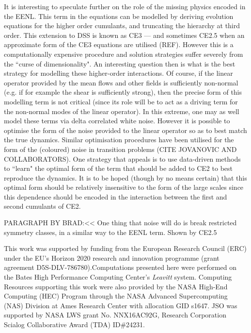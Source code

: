 \documentclass{jfm}
\begin{document}
It is interesting to speculate further on the role of the missing physics encoded in the EENL. This term in the equations can be modelled by deriving evolution equations for the higher order cumulants, and truncating the hierarchy at third order. This extension to DSS is known as CE3 --- and sometimes CE2.5 when an approximate form of the CE3 equations are utilised (REF). However this is a computationally expensive procedure and solution strategies suffer severely from the ``curse of dimensionality". An interesting question then is what is the best strategy for modelling these higher-order interactions. Of course, if the linear operator provided by the mean flows and other fields is sufficiently non-normal (e.g. if for example the shear is sufficiently strong), then the precise form of this modelling term is not critical (since its role will be to act as a driving term for the non-normal modes of the linear operator). In this extreme, one may as well model these terms via delta correlated white noise. However it is possible to optimise the form of the noise provided to the linear operator so as to best match the true dynamics. Similar optimisation procedures have been utilised for the form of the (coloured) noise in transition problems (CITE JOVANOVIC AND COLLABORATORS). One strategy that appeals is to use data-driven methods to ``learn" the optimal form of the term that should be added to CE2 to best reproduce the dynamics. It is to be hoped (though by no means certain) that this optimal form should be relatively insensitive to the form of the large scales since this dependence should be encoded in the interaction between the first and second cumulants of CE2.   

PARAGRAPH BY BRAD:<< One thing that noise will do is break restricted symmetry classes, in a similar way to the EENL term. Shown by CE2.5

\bigskip


This work was supported by funding from the European Research Council (ERC) under the EU’s Horizon 2020 research and innovation programme (grant agreement D5S-DLV-786780).Computations presented here were performed on the Bates High Performance Computing Center's \emph{Leavitt} system. Computing Resources supporting this work were also provided by the NASA High-End Computing (HEC) Program through the NASA Advanced Supercomputing (NAS) Division at Ames Research Center with allocation GID s1647.
JSO was supported by NASA LWS grant No. NNX16AC92G, Research Corporation Scialog Collaborative Award (TDA) ID\#24231.
\end{document}
